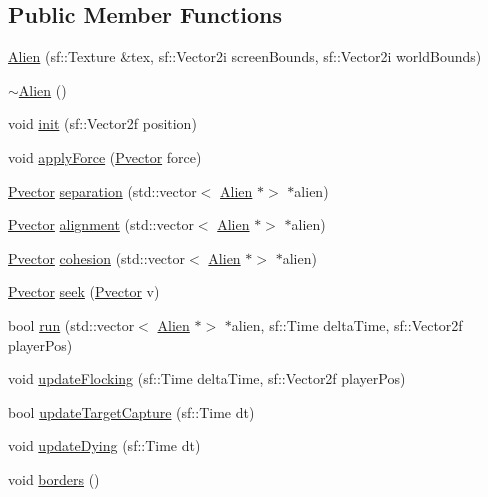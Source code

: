 \subsection*{Public Member Functions}
\begin{DoxyCompactItemize}
\item 
\hyperlink{class_alien_aa2c356638e31ea4bbd42c2aa2a8cb5f4}{Alien} (sf\+::\+Texture \&tex, sf\+::\+Vector2i screen\+Bounds, sf\+::\+Vector2i world\+Bounds)
\item 
\hyperlink{class_alien_a7cdfd79d84b51a18003bf41585aedd43}{$\sim$\+Alien} ()
\item 
void \hyperlink{class_alien_a516b6245841735741f287b38c20b8853}{init} (sf\+::\+Vector2f position)
\item 
void \hyperlink{class_alien_a0b57e5b389ab46700ceee75c3b174d0f}{apply\+Force} (\hyperlink{class_pvector}{Pvector} force)
\item 
\hyperlink{class_pvector}{Pvector} \hyperlink{class_alien_a9ff194fbdb318bb84153e55051c5af8e}{separation} (std\+::vector$<$ \hyperlink{class_alien}{Alien} $\ast$$>$ $\ast$alien)
\item 
\hyperlink{class_pvector}{Pvector} \hyperlink{class_alien_ae1e91676d1f4bef69397a21d6ba4867a}{alignment} (std\+::vector$<$ \hyperlink{class_alien}{Alien} $\ast$$>$ $\ast$alien)
\item 
\hyperlink{class_pvector}{Pvector} \hyperlink{class_alien_aa4d875c73cb6899cb9854bca83443ce4}{cohesion} (std\+::vector$<$ \hyperlink{class_alien}{Alien} $\ast$$>$ $\ast$alien)
\item 
\hyperlink{class_pvector}{Pvector} \hyperlink{class_alien_aadb10553ae97d31376dba97e0b0599a8}{seek} (\hyperlink{class_pvector}{Pvector} v)
\item 
bool \hyperlink{class_alien_a7ae22c9eb89a6b1896bc7c237880b9ba}{run} (std\+::vector$<$ \hyperlink{class_alien}{Alien} $\ast$$>$ $\ast$alien, sf\+::\+Time delta\+Time, sf\+::\+Vector2f player\+Pos)
\item 
void \hyperlink{class_alien_a37c8acacf468919027cb84593a0fc284}{update\+Flocking} (sf\+::\+Time delta\+Time, sf\+::\+Vector2f player\+Pos)
\item 
bool \hyperlink{class_alien_a6081c8a068679e203e6e920b9197e4de}{update\+Target\+Capture} (sf\+::\+Time dt)
\item 
void \hyperlink{class_alien_aa85a70c1e7ed8d7d728df94ad47b83a2}{update\+Dying} (sf\+::\+Time dt)
\item 
void \hyperlink{class_alien_a768bd4e8f7b409f8a7c3b4ac6cdd598f}{borders} ()

\end{DoxyCompactItemize}

